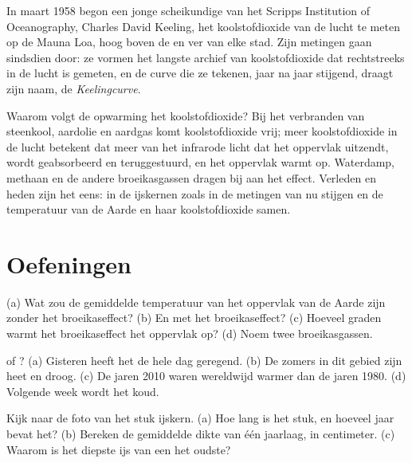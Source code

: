 \begin{history}
In maart 1958 begon een jonge scheikundige van het Scripps Institution of
Oceanography, Charles David Keeling, het koolstofdioxide van de lucht te
meten op de Mauna Loa, hoog boven de  en ver van elke stad. Zijn
metingen gaan sindsdien door: ze vormen het langste archief van
koolstofdioxide dat rechtstreeks in de lucht is gemeten, en de curve die
ze tekenen, jaar na jaar stijgend, draagt zijn naam, de
\emph{Keelingcurve}.
\end{history}

Waarom volgt de opwarming het koolstofdioxide? Bij het verbranden van
steenkool, aardolie en aardgas komt koolstofdioxide vrij; meer
koolstofdioxide in de lucht betekent dat meer van het infrarode licht dat
het oppervlak uitzendt, wordt geabsorbeerd en teruggestuurd, en het
oppervlak warmt op. Waterdamp, methaan en de andere broeikasgassen dragen
bij aan het effect. Verleden en heden zijn het eens: in de ijskernen
zoals in de metingen van nu stijgen en  de temperatuur van de Aarde
en haar koolstofdioxide samen.

\section{Oefeningen}

\begin{exercise}[$\star$]\label{exo:g9:climate-past-and-present:1}
(a) Wat zou de gemiddelde temperatuur van het oppervlak van de Aarde zijn
zonder het broeikaseffect? (b) En met het broeikaseffect? (c) Hoeveel
graden warmt het broeikaseffect het oppervlak op? (d) Noem twee
broeikasgassen.
\end{exercise}

\begin{exercise}[$\star$]\label{exo:g9:climate-past-and-present:2}
 of ? (a) Gisteren heeft het de hele dag geregend. (b) De
zomers in dit gebied zijn heet en droog. (c) De jaren 2010 waren
wereldwijd warmer dan de jaren 1980. (d) Volgende week wordt het koud.
\end{exercise}

\begin{exercise}[$\star$]\label{exo:g9:climate-past-and-present:3}
Kijk naar de foto van het stuk ijskern. (a) Hoe lang is het stuk, en
hoeveel jaar  bevat het? (b) Bereken de gemiddelde dikte van één
jaarlaag, in centimeter. (c) Waarom is het diepste ijs van een  het
oudste?
\end{exercise}

